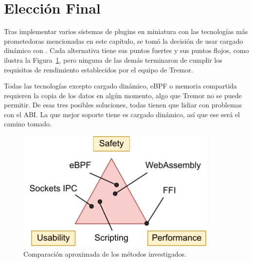 \section{Elección Final}

Tras implementar varios sistemas de plugins en miniatura con las tecnologías más
prometedoras mencionadas en este capítulo, se tomó la decisión de usar cargado
dinámico con \abistable. Cada alternativa tiene sus puntos fuertes y sus puntos
flojos, como ilustra la Figura~\ref{fig:triangle}, pero ninguna de las demás
terminaron de cumplir los requisitos de rendimiento establecidos por el equipo
de Tremor.

Todas las tecnologías excepto cargado dinámico, eBPF o memoria compartida
requieren la copia de los datos en algún momento, algo que Tremor no se puede
permitir. De esas tres posibles soluciones, todas tienen que lidiar con
problemas con el ABI. La que mejor soporte tiene es cargado dinámico, así que
ese será el camino tomado.

\begin{figure}
    \centering
    \includegraphics[width=10cm]{./Imagenes/triangle.pdf}
    \caption{Comparación aproximada de los métodos investigados.}%
    \label{fig:triangle}
\end{figure}
